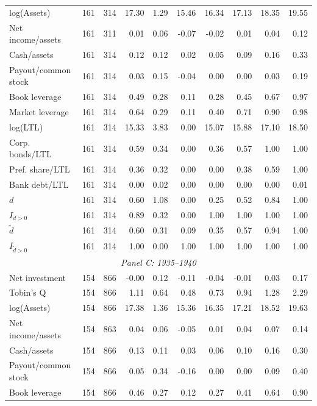 \begin{threeparttable}
\begin{tabular}{lrrrrrrrrr}
log(Assets) & 161 & 314 & 17.30 & 1.29 & 15.46 & 16.34 & 17.13 & 18.35 & 19.55 \\
Net income/assets & 161 & 311 & 0.01 & 0.06 & -0.07 & -0.02 & 0.01 & 0.04 & 0.12 \\
Cash/assets & 161 & 314 & 0.12 & 0.12 & 0.02 & 0.05 & 0.09 & 0.16 & 0.33 \\
Payout/common stock & 161 & 314 & 0.03 & 0.15 & -0.04 & 0.00 & 0.00 & 0.03 & 0.19 \\
Book leverage & 161 & 314 & 0.49 & 0.28 & 0.11 & 0.28 & 0.45 & 0.67 & 0.97 \\
Market leverage & 161 & 314 & 0.64 & 0.29 & 0.11 & 0.40 & 0.71 & 0.90 & 0.98 \\
log(LTL) & 161 & 314 & 15.33 & 3.83 & 0.00 & 15.07 & 15.88 & 17.10 & 18.50 \\
Corp. bonds/LTL & 161 & 314 & 0.59 & 0.34 & 0.00 & 0.36 & 0.57 & 1.00 & 1.00 \\
Pref. share/LTL & 161 & 314 & 0.36 & 0.32 & 0.00 & 0.00 & 0.38 & 0.59 & 1.00 \\
Bank debt/LTL & 161 & 314 & 0.00 & 0.02 & 0.00 & 0.00 & 0.00 & 0.00 & 0.01 \\
\ensuremath{d} & 161 & 314 & 0.60 & 1.08 & 0.00 & 0.25 & 0.52 & 0.84 & 1.00 \\
\ensuremath{I_{d>0}} & 161 & 314 & 0.89 & 0.32 & 0.00 & 1.00 & 1.00 & 1.00 & 1.00 \\
\ensuremath{\tilde{d}} & 161 & 314 & 0.60 & 0.31 & 0.09 & 0.35 & 0.57 & 0.94 & 1.00 \\
\ensuremath{I_{\tilde{d}>0}} & 161 & 314 & 1.00 & 0.00 & 1.00 & 1.00 & 1.00 & 1.00 & 1.00 \\
\midrule
\multicolumn{10}{c}{\textit{Panel C: 1935--1940}} \\
\midrule
Net investment & 154 & 866 & -0.00 & 0.12 & -0.11 & -0.04 & -0.01 & 0.03 & 0.17 \\
Tobin's Q & 154 & 866 & 1.11 & 0.64 & 0.48 & 0.73 & 0.94 & 1.28 & 2.29 \\
log(Assets) & 154 & 866 & 17.38 & 1.36 & 15.36 & 16.35 & 17.21 & 18.52 & 19.63 \\
Net income/assets & 154 & 863 & 0.04 & 0.06 & -0.05 & 0.01 & 0.04 & 0.07 & 0.14 \\
Cash/assets & 154 & 866 & 0.13 & 0.11 & 0.03 & 0.06 & 0.10 & 0.16 & 0.30 \\
Payout/common stock & 154 & 866 & 0.05 & 0.34 & -0.16 & 0.00 & 0.00 & 0.09 & 0.40 \\
Book leverage & 154 & 866 & 0.46 & 0.27 & 0.12 & 0.27 & 0.41 & 0.64 & 0.90 \\

\end{tabular}
\end{threeparttable}
